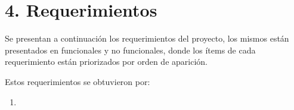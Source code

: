 \section{4. Requerimientos}
\label{sec:requerimientos}


Se presentan a continuación los requerimientos del proyecto, los mismos están presentados en funcionales y no funcionales, donde los ítems de cada requerimiento están priorizados por orden de aparición.

Estos requerimientos se obtuvieron por:

\begin{enumerate}
\item 
		
\end{enumerate}